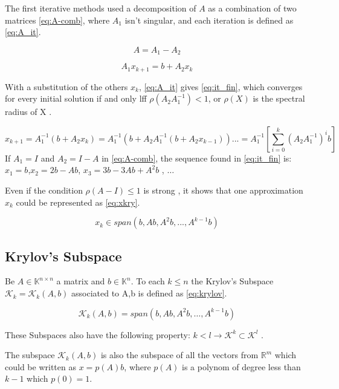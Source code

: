 The first iterative methods used a decomposition of $A$ as a combination of two matrices \ref{eq:A-comb}, where $A_{1}$ isn't singular, and each iteration is defined as \ref{eq:A_it}.

\begin{equation}\label{eq:A-comb}
    A = A_{1} - A_{2}
\end{equation}

\begin{equation}\label{eq:A_it}
    A_{1} x_{k+1} = b + A_{2}x_{k}
\end{equation}

With a substitution of the others $x_{k}$, \ref{eq:A_it} gives \ref{eq:it_fin}, which converges for every initial solution if and only lff $\rho(A_{2}A_{1}^{-1}) < 1$, or $\rho(X)$ is the spectral radius of X \cite{bonnet}.

\begin{equation}\label{eq:it_fin}
    x_{k+1} = A_{1}^{-1}(b + A_{2}x_{k}) = A_{1}^{-1}(b + A_{2}A_{1}^{-1}(b + A_{2}x_{k-1}))... = A_{1}^{-1} \left[ \sum_{i=0}^{k} (A_{2}A_{1}^{-1})^{i}b\right]
\end{equation}
If $A_{1} = I$ and $A_{2} = I - A$ in \ref{eq:A-comb}, the sequence found in \ref{eq:it_fin} is: $x_{1} = b$,$x_{2} = 2b- Ab$, $x_{3} = 3b-3Ab+A^{2}b$ , $\dots$

Even if the condition $\rho(A-I) \leq 1$ is strong \cite{bonnet}, it shows that one approximation $x_{k}$ could be represented as \ref{eq:xkry}.

\begin{equation}\label{eq:xkry}
    x_{k} \in span(b,Ab,A^{2}b,...,A^{k-1}b)
\end{equation}

\subsection{Krylov's Subspace}
Be $A \in \mathbb{K}^{n \times n}$ a matrix and $b\in \mathbb{K}^{n}$. To each $k\leq n$ the Krylov's Subspace $\mathcal{K}_{k}=\mathcal{K}_{k}(A,b)$ associated to A,b is defined as \ref{eq:krylov}.

\begin{equation}\label{eq:krylov}
    \mathcal{K}_{k}(A,b) = span(b,Ab,A^{2}b,\dots , A^{k-1}b)
\end{equation}

These Subspaces also have the following property: $k<l \to \mathcal{K}^{k} \subset \mathcal{K}^{l}$ \cite{bonnet}.

The subspace $\mathcal{K}_{k}(A,b)$ is also the subspace of all the vectors from $\mathbb{R}^{m}$ which could be written as $x=p(A)b$, where $p(A)$ is a polynom of degree less than $k-1$ which $p(0)=1$.

